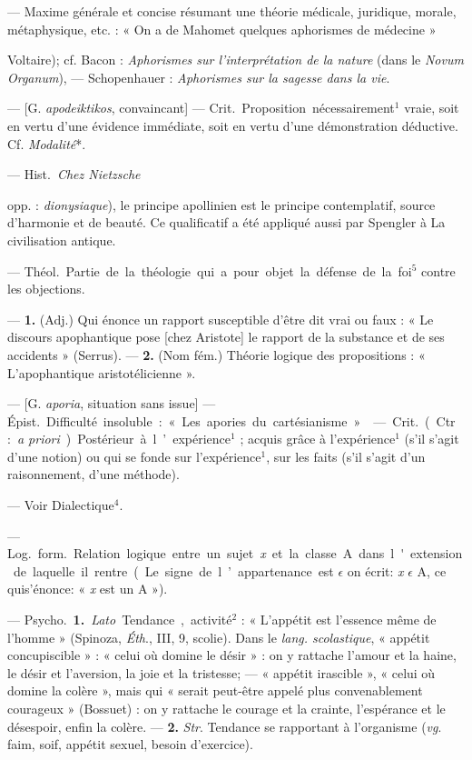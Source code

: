 \begin{itemize}[leftmargin=1cm, label=, itemsep=1pt]
{{ — Maxime générale et
concise résumant une théorie médicale, juridique, morale,
métaphysique, etc. : « On a de Mahomet quelques aphorismes
de médecine » {Voltaire); cf. Bacon : {\it Aphorismes sur
l'interprétation de la nature} (dans le
{\it Novum Organum}), — Schopenhauer :
{\it Aphorismes sur la sagesse dans la vie}.

 — [G. {\it apodeiktikos}, convaincant] — \si{Crit.}
Proposition nécessairement$^1$ vraie,
soit en vertu d’une évidence immédiate, soit en vertu d’une
démonstration déductive. Cf. {\it Modalité}*.

 — \si{Hist.} {\it Chez Nietzsche}
{opp. : {\it dionysiaque}), le principe
apollinien est le principe contemplatif, source d'harmonie et de
beauté. Ce qualificatif a été appliqué
aussi par Spengler à La civilisation
antique.

 — \si{Théol.} Partie de la
théologie qui a pour objet la défense
de la foi$^5$ contre les objections.

 — {\bf 1.} (Adj.) Qui énonce
un rapport susceptible d'être dit vrai
ou faux : « Le discours apophantique
pose [chez Aristote] le rapport de la
substance et de ses accidents » (Serrus). — {\bf 2.} (Nom fém.) Théorie
logique des propositions : « L’apophantique aristotélicienne ».

 — [G. {\it aporia}, situation sans issue]
— \si{Épist.} Difficulté insoluble : « Les
apories du cartésianisme. »

 — \si{Crit.} (Ctr. : {\it a priori}).
Postérieur à l’expérience$^1$ ; acquis
grâce à l'expérience$^1$ (s’il s’agit d'une
notion) ou qui se fonde sur l'expérience$^1$,
sur les faits (s’il s’agit d’un
raisonnement, d’une méthode).

 — Voir Dialectique$^4$.

 — \si{Log.} \si{form.} Relation
logique entre un sujet {\it x} et la
classe A dans l'extension de laquelle
il rentre (Le signe de l’appartenance
est $\epsilon$ on écrit: {\it x} $\epsilon$ A, ce quis’énonce:
« {\it x} est un A »).

— \si{Psycho.} {\bf 1.} {\it Lato}. Tendance,
activité$^2$ : « L'appétit est l'essence
même de l’homme » (Spinoza, {\it Éth}.,
III, 9, scolie). Dans le {\it lang. scolastique}, « appétit concupiscible » :
« celui où domine le désir » : on y
rattache l'amour et la haine, le désir
et l’aversion, la joie et la tristesse; —
« appétit irascible », « celui où domine
la colère », mais qui « serait peut-être
appelé plus convenablement courageux » (Bossuet) : on y rattache le
courage et la crainte, l'espérance et
le désespoir, enfin la colère. — {\bf 2.} {\it Str}.
Tendance se rapportant à l'organisme ({\it vg}. faim, soif, appétit sexuel,
besoin d’exercice).

}}}}
\end{itemize}
